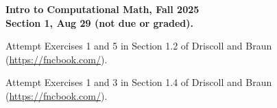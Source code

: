 \documentclass[11pt]{article}
\begin{document}
\begin{center}
{\bf Intro to Computational Math, Fall 2025\\
Section 1, Aug 29 (not due or graded).\\
}
\end{center}


 Attempt Exercises 1 and 5 in Section 1.2 of Driscoll and Braun (\url{https://fncbook.com/}).

\vskip1cm

 Attempt Exercises 1 and 3 in Section 1.4 of Driscoll and Braun (\url{https://fncbook.com/}).





\end{document}
